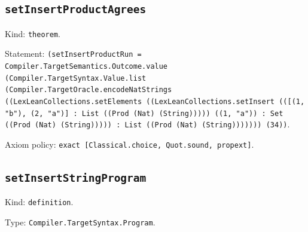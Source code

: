 \documentclass[11pt]{article}
\begin{document}
\subsection*{\texttt{setInsertProductAgrees}}
\noindent Kind: \texttt{theorem}.\par
\noindent Statement: \texttt{(setInsertProductRun = Compiler.TargetSemantics.Outcome.value (Compiler.TargetSyntax.Value.list (Compiler.TargetOracle.encodeNatStrings ((LexLeanCollections.setElements ((LexLeanCollections.setInsert (([(1, "b"), (2, "a")] : List ((Prod (Nat) (String))))) ((1, "a")) : Set ((Prod (Nat) (String))))) : List ((Prod (Nat) (String))))))) (34))}.\par
\noindent Axiom policy: \texttt{exact [Classical.choice, Quot.sound, propext]}.\par
\subsection*{\texttt{setInsertStringProgram}}
\noindent Kind: \texttt{definition}.\par
\noindent Type: \texttt{Compiler.TargetSyntax.Program}.\par
\end{document}
